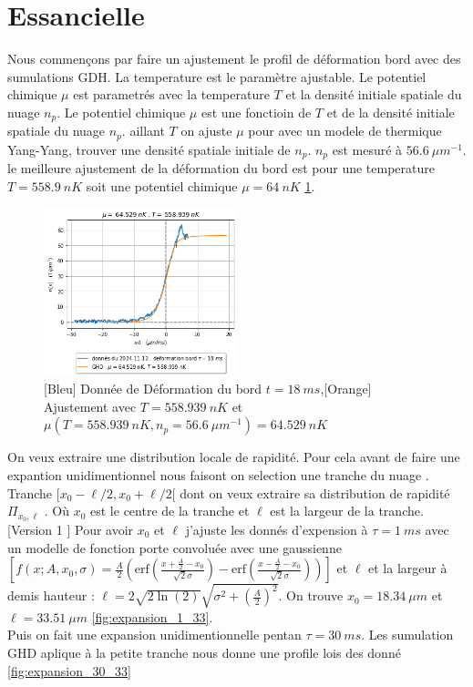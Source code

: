 \documentclass[a3, 10pt,twoside]{article}          %
\theoremstyle{plain}
\theoremstyle{definition}
\theoremstyle{remark}
\theoremstyle{definition} %
\begin{document}
	\section{Essancielle}
	
	Nous commençons par faire un ajustement le profil de déformation bord avec des sumulations GDH. La temperature est le paramètre ajustable. Le potentiel chimique $\mu$ est parametrés avec la temperature $T$ et la densité initiale spatiale du nuage $n_p$. Le potentiel chimique $\mu$ est une fonctioin de $T$ et de la densité initiale spatiale du nuage $n_p$. aillant $T$ on ajuste $\mu$ pour avec un modele de thermique Yang-Yang, trouver une densité spatiale initiale de $n_p$. $n_p$ est mesuré à $56.6 ~\mu m ^{-1}$.  le meilleure ajustement de la déformation du bord est pour une temperature $T = 558.9 ~nK$ soit une potentiel chimique $\mu = 64~nK$ \ref{}.\\
	\begin{figure}[H]
        \centering
		\includegraphics[width=0.5\textwidth]{Figures/simul_deformation}
        \caption{{\color{blue} [Bleu] Donnée de Déformation du bord $t= 18 ~ms$},{\color{orange}[Orange]  Ajustement avec $T = 558.939 ~nK$ et $\mu ( T =558.939 ~nK  , n_p = 56.6 ~{\mu m}^{-1} )= 64.529~nK$} }
        		\label{fig1.1:ajustementdeform}
    \end{figure}
	On veux extraire une distribution locale de rapidité. Pour cela avant de faire une expantion unidimentionnel nous faisont on selection une tranche du nuage \cite{dubois_probing_2024}. Tranche $[ x_0 - \ell/2 ,x_0 + \ell/2 [$ dont on veux extraire sa distribution de rapidité $\Pi_{x_0 , \ell}$ . Où $x_0$ est le centre de la tranche et $\ell$ est la largeur de la tranche.\\
	
	[Version 1 ] 
	Pour avoir $x_0$ et $\ell$ j'ajuste les donnés d'expension à $\tau = 1 ~ ms$ avec un modelle de fonction porte convoluée avec une gaussienne  $ \left [ f(x;A, x_0 , \sigma) = \frac{A}{2} \left ( \mbox{erf} \left (  \frac{x + \frac{A}2 - x_0 }{\sqrt{2} \sigma } \right ) - \mbox{erf} \left (  \frac{x - \frac{A}2 - x_0 }{\sqrt{2} \sigma } \right ) \right ) \right ] $  et $\ell$ et la largeur à demis hauteur : $\ell = 2\sqrt{ 2 \ln (2) } \sqrt{ \sigma^2 + \left ( \frac{ A}{2} \right )^2 } $. On trouve $x_0 = 18.34 ~\mu m $ et $\ell = 33.51 ~\mu m $ \ref{fig:expansion_1_33}.\\
	Puis on fait une expansion unidimentionnelle pentan $\tau = 30 ~ ms $. Les sumulation GHD aplique à la petite tranche nous donne une profile lois des donné \ref{fig:expansion_30_33} 
	
\end{document}
